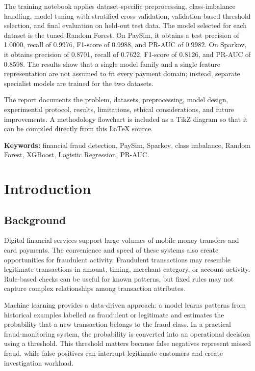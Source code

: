 \documentclass[12pt,a4paper]{report}
\begin{document}
The training notebook applies dataset-specific preprocessing, class-imbalance handling, model tuning with stratified cross-validation, validation-based threshold selection, and final evaluation on held-out test data. The model selected for each dataset is the tuned Random Forest. On PaySim, it obtains a test precision of 1.0000, recall of 0.9976, F1-score of 0.9988, and PR-AUC of 0.9982. On Sparkov, it obtains precision of 0.8701, recall of 0.7622, F1-score of 0.8126, and PR-AUC of 0.8598. The results show that a single model family and a single feature representation are not assumed to fit every payment domain; instead, separate specialist models are trained for the two datasets.

The report documents the problem, datasets, preprocessing, model design, experimental protocol, results, limitations, ethical considerations, and future improvements. A methodology flowchart is included as a TikZ diagram so that it can be compiled directly from this LaTeX source.

\textbf{Keywords:} financial fraud detection, PaySim, Sparkov, class imbalance, Random Forest, XGBoost, Logistic Regression, PR-AUC.

\clearpage
{}

\chapter{Introduction}
\section{Background}
Digital financial services support large volumes of mobile-money transfers and card payments. The convenience and speed of these systems also create opportunities for fraudulent activity. Fraudulent transactions may resemble legitimate transactions in amount, timing, merchant category, or account activity. Rule-based checks can be useful for known patterns, but fixed rules may not capture complex relationships among transaction attributes.

Machine learning provides a data-driven approach: a model learns patterns from historical examples labelled as fraudulent or legitimate and estimates the probability that a new transaction belongs to the fraud class. In a practical fraud-monitoring system, the probability is converted into an operational decision using a threshold. This threshold matters because false negatives represent missed fraud, while false positives can interrupt legitimate customers and create investigation workload.
\end{document}
